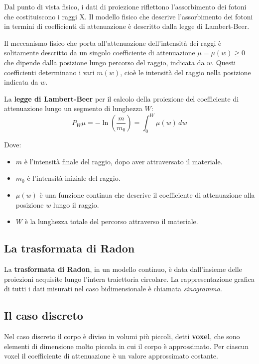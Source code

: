 \documentclass[12pt,a4paper]{report}
\begin{document}
Dal punto di vista fisico, i dati di proiezione riflettono l'assorbimento dei fotoni che costituiscono i raggi X.
Il modello fisico che descrive l'assorbimento dei fotoni in termini di coefficienti di attenuazione è descritto dalla legge di
Lambert-Beer.

Il meccanismo fisico che porta all'attenuazione dell'intensità dei raggi è solitamente descritto da un singolo coefficiente di
attenuazione \(\mu = \mu(w) \ge 0\) che dipende dalla posizione lungo percorso del raggio, indicata da \(w\).
Questi coefficienti determinano i vari \(m(w)\), cioè le intensità del raggio nella posizione indicata da \(w\).

La \textbf{legge di Lambert-Beer} per il calcolo della proiezione del coefficiente di attenuazione lungo un segmento di lunghezza
\(W\):
\begin{equation} \label{eq:law_lambert-beer}
  P_W\mu = - \ln{(\frac{m}{m_0})} = \int_0^W \mu(w) \, dw
\end{equation}

Dove:
\begin{itemize}
  \item \(m\) è l'intensità finale del raggio, dopo aver attraversato il materiale.
  \item \(m_0\) è l'intensità iniziale del raggio.
  \item \(\mu(w)\) è una funzione continua che descrive il coefficiente di attenuazione alla posizione \(w\) lungo il raggio.
  \item \(W\) è la lunghezza totale del percorso attraverso il materiale.
\end{itemize}

\subsection{La trasformata di Radon}

La \textbf{trasformata di Radon}, in un modello continuo, è data dall'insieme delle proiezioni acquisite lungo l'intera
traiettoria circolare.
La rappresentazione grafica di tutti i dati misurati nel caso bidimensionale è chiamata \textit{sinogramma}.

\subsection{Il caso discreto}

Nel caso discreto il corpo è diviso in volumi più piccoli, detti \textbf{voxel}, che sono elementi di dimensione molto piccola in
cui il corpo è approssimato.
Per ciascun voxel il coefficiente di attenuazione è un valore approssimato costante.
\end{document}

